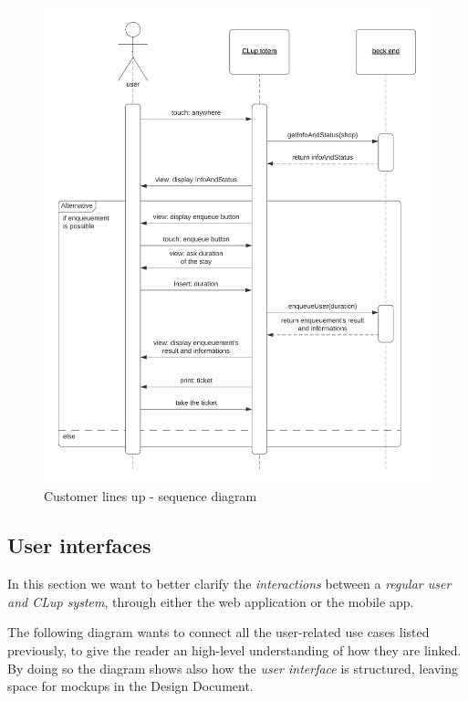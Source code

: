 \begin{figure}[h!]
    \centering
    \includegraphics[width=\textwidth]{Images/sequencediagrams/CustomerlinesupSD.png}
    \caption{\label{fig:customerlinesup}Customer lines up - sequence diagram}
\end{figure}

\FloatBarrier

\subsection{User interfaces}
\label{subsect:userinterfaces}

In this section we want to better clarify the \textit{interactions} between a \textit{regular user and CLup system}, through either the web application or the mobile app. 

The following diagram wants to connect all the user-related use cases listed previously, to give the reader an high-level understanding of how they are linked. By doing so the diagram shows also how the \textit{user interface} is structured, leaving space for mockups in the Design Document.

